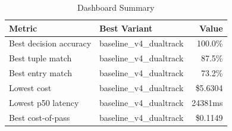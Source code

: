 \begin{table}[htbp]
\centering
\caption{Dashboard Summary}
\label{tab:summary}
\begin{tabular}{l l r}
\toprule
Metric & Best Variant & Value \\
\midrule
  Best decision accuracy & baseline\_v4\_dualtrack & 100.0\% \\
  Best tuple match & baseline\_v4\_dualtrack & 87.5\% \\
  Best entry match & baseline\_v4\_dualtrack & 73.2\% \\
  Lowest cost & baseline\_v4\_dualtrack & \$5.6304 \\
  Lowest p50 latency & baseline\_v4\_dualtrack & 24381ms \\
  Best cost-of-pass & baseline\_v4\_dualtrack & \$0.1149 \\
\bottomrule
\end{tabular}
\end{table}
